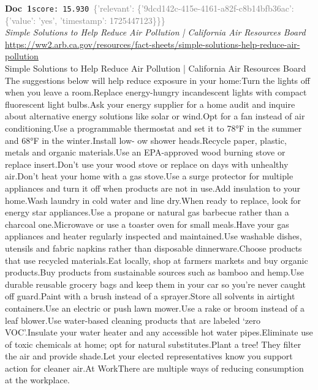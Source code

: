 \documentclass[a4paper,11pt]{article}
\begin{document}
\begin{docenv}
{\footnotesize\textcolor{doccolor}{\textbf{Doc~1}}}\hfill{\tiny\texttt{score:~15.930}}\ {\tiny\textcolor{gray}{\{'relevant': \{'9dcd142c-415e-4161-a82f-c8b14bfb36ac': \{'value': 'yes', 'timestamp': 1725447123\}\}\}}}\\[3pt]
{\small\textit{Simple Solutions to Help Reduce Air Pollution | California Air Resources Board}}\\[2pt]
{\tiny\url{https://ww2.arb.ca.gov/resources/fact-sheets/simple-solutions-help-reduce-air-pollution}}\\[4pt]
{\footnotesize Simple Solutions to Help Reduce Air Pollution | California Air Resources Board
The suggestions below will help reduce exposure in your home:Turn the lights off when you leave a room.Replace energy-hungry incandescent lights with compact fluorescent light bulbs.Ask your energy supplier for a home audit and inquire about alternative energy solutions like solar or wind.Opt for a fan instead of air conditioning.Use a programmable thermostat and set it to 78°F in the summer and 68°F in the winter.Install low- ow shower heads.Recycle paper, plastic, metals and organic materials.Use an EPA-approved wood burning stove or replace insert.Don’t use your wood stove or replace on days with unhealthy air.Don’t heat your home with a gas stove.Use a surge protector for multiple appliances and turn it off when products are not in use.Add insulation to your home.Wash laundry in cold water and line dry.When ready to replace, look for energy star appliances.Use a propane or natural gas barbecue rather than a charcoal one.Microwave or use a toaster oven for small meals.Have your gas appliances and heater regularly inspected and maintained.Use washable dishes, utensils and fabric napkins rather than disposable dinnerware.Choose products that use recycled materials.Eat locally, shop at farmers markets and buy organic products.Buy products from sustainable sources such as bamboo and hemp.Use durable reusable grocery bags and keep them in your car so you’re never caught off guard.Paint with a brush instead of a sprayer.Store all solvents in airtight containers.Use an electric or push lawn mower.Use a rake or broom instead of a leaf blower.Use water-based cleaning products that are labeled ‘zero VOC’.Insulate your water heater and any accessible hot water pipes.Eliminate use of toxic chemicals at home; opt for natural substitutes.Plant a tree! They filter the air and provide shade.Let your elected representatives know you support action for cleaner air.At WorkThere are multiple ways of reducing consumption at the workplace.}
\end{docenv}
\end{document}
